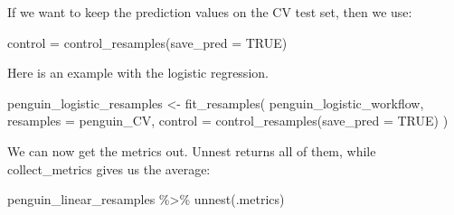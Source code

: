 \documentclass[
]{article}
\newenvironment{Shaded}{\begin{snugshade}}{\end{snugshade}}
\newcommand{\AttributeTok}[1]{\textcolor[rgb]{0.77,0.63,0.00}{#1}}
\newcommand{\ConstantTok}[1]{\textcolor[rgb]{0.00,0.00,0.00}{#1}}
\newcommand{\FunctionTok}[1]{\textcolor[rgb]{0.00,0.00,0.00}{#1}}
\newcommand{\NormalTok}[1]{#1}
\newcommand{\OtherTok}[1]{\textcolor[rgb]{0.56,0.35,0.01}{#1}}
\newcommand{\SpecialCharTok}[1]{\textcolor[rgb]{0.00,0.00,0.00}{#1}}
\begin{document}
If we want to keep the prediction values on the CV test set, then we
use:

\begin{Shaded}
\begin{Highlighting}[]
\NormalTok{control }\OtherTok{=} \FunctionTok{control\_resamples}\NormalTok{(}\AttributeTok{save\_pred =} \ConstantTok{TRUE}\NormalTok{)}
\end{Highlighting}
\end{Shaded}

Here is an example with the logistic regression.

\begin{Shaded}
\begin{Highlighting}[]
\NormalTok{penguin\_logistic\_resamples }\OtherTok{\textless{}{-}} 
  \FunctionTok{fit\_resamples}\NormalTok{( penguin\_logistic\_workflow, }
                 \AttributeTok{resamples =}\NormalTok{ penguin\_CV, }
                 \AttributeTok{control =} \FunctionTok{control\_resamples}\NormalTok{(}\AttributeTok{save\_pred =} \ConstantTok{TRUE}\NormalTok{)}
\NormalTok{)}
\end{Highlighting}
\end{Shaded}

We can now get the metrics out. Unnest returns all of them, while
collect\_metrics gives us the average:

\begin{Shaded}
\begin{Highlighting}[]
\NormalTok{penguin\_linear\_resamples }\SpecialCharTok{\%\textgreater{}\%} \FunctionTok{unnest}\NormalTok{(.metrics)}
\end{Highlighting}
\end{Shaded}
\end{document}
